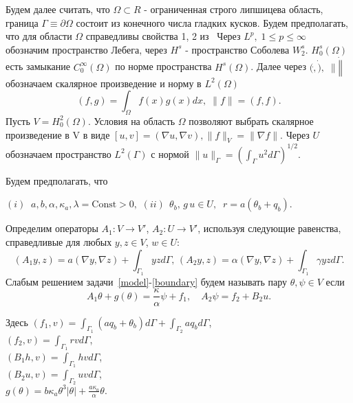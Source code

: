 Будем далее считать, что $\Omega \subset R$ - ограниченная строго липшицева область,
граница $\Gamma \equiv \partial \Omega$ состоит из конечного числа гладких кусков.
Будем предполагать, что для области $\Omega$ справедливы свойства 1, 2 из~\cite{}
Через $L^p, \; 1 \leq p \leq \infty$ обозначим пространство Лебега, через $H^s$ - пространство Соболева $W^s_2$.
$H^s_0(\Omega)$ есть замыкание $C^\infty_0(\Omega)$ по норме пространства $H^s(\Omega)$.
Далее через $(\dot, \dot), \; \| \dot \|$ обозначаем скалярное произведение и норму в $L^2(\Omega)$
\[
    (f, g) = \int_\Omega f(x)g(x)dx, \; \| f \| = (f, f).
\]
Пусть $V = H^2_0(\Omega)$.
Условия на область $\Omega$ позволяют выбрать скалярное произведение в V в виде
$[u, v] = (\nabla u, \nabla v), \| f \|_V = \| \nabla f \|$.
Через $U$ обозначаем пространство $L^2(\Gamma)$ с нормой
$\|u\|_\Gamma=\left(\int_\Gamma u^2 d\Gamma\right)^{1/2}.$

Будем предполагать, что

$(i) \;\; a,b,\alpha,\kappa_a, \lambda =\textrm{Const} > 0 ,$
$(ii) \;\, \theta_b, \,g \, u \in U,\;\; r=a(\theta_b+q_b).$


Определим операторы $A_1\colon V \to V'$, $A_2\colon U \to V'$, используя
следующие равенства, справедливые для любых $y,z \in V$, $w\in U$:
\[
    (A_1 y,z) = a(\nabla y, \nabla z) + \int_{\Gamma_1} yz d\Gamma, \,
    (A_2 y, z) = \alpha (\nabla y, \nabla z) + \int_{\Gamma_1} \gamma yz d\Gamma.
\]
Слабым решением задачи~\eqref{model}-\eqref{boundary} будем называть
пару $\theta, \psi \in V$ если
\begin{equation}
    \label{weak}
    A_1\theta  + g(\theta) = \frac{\kappa}{\alpha} \psi + f_1, \quad
    A_2\psi = f_2 + B_2 u.
\end{equation}

Здесь
$(f_1, v) = \int_{\Gamma_1} (a q_b + \theta_b)d\Gamma + \int_{\Gamma_2} a q_b d\Gamma$,\\
$(f_2, v) = \int_{\Gamma_1} r v d\Gamma$,\\
$(B_1 h,v) = \int_{\Gamma_1} h v d\Gamma$,\\
$(B_2 u, v) = \int_{\Gamma_2} u v d\Gamma$,\\
$g(\theta) = b\kappa_a \theta^3 |\theta| + \frac{a\kappa_a}{\alpha}\theta.$


